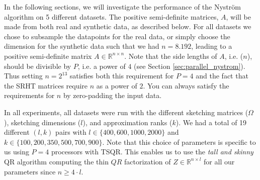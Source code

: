 \documentclass{article}
\theoremstyle{definition}
\begin{document}
In the following sections, we will investigate the performance of the Nyström
algorithm on 5 different datasets. The positive semi-definite matrices, $A$,
will be made from both real and synthetic data, as described below. For all
datasets we chose to subsample the datapoints for the real data, or simply
choose the dimension for the synthetic data such that we had $n=8.192$, leading
to a positive semi-definite matrix $A\in\mathbb{R}^{n\times n}$. Note that the
side lengths of $A$, i.e. ($n$), should be divisible by $P$, i.e. a power of $4$
(see Section \ref{sec:parallel_nystrom}). Thus setting $n=2^{13}$ satisfies both
this requirement for $P=4$ and the fact that the SRHT matrices require $n$ as a
power of $2$. You can always satisfy the requirements for $n$ by zero-padding
the input data. \newline

In all experiments, all datasets were run with the different sketching matrices
($\Omega$), sketching dimensions ($l$), and approximation ranks ($k$). We had a
total of 19 different $(l,k)$ pairs with $l\in\{400, 600, 1000, 2000\}$ and
$k\in\{100, 200, 350, 500, 700, 900\}$. Note that this choice of parameters is
specific to us using $P=4$ processors with TSQR. This enables us to use the
\textit{tall and skinny} QR algorithm computing the thin $QR$ factorization of
$Z\in\mathbb{R}^{n\times l}$ for all our parameters since $n\geq 4\cdot
l$.\newline
\end{document}
